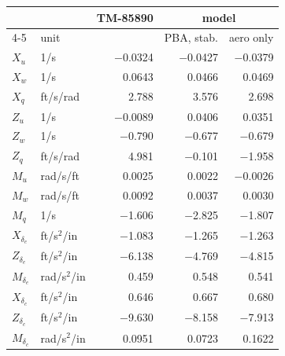 \begin{tabular}{@{}llrrr@{}}
\toprule
 & & TM-85890 & \multicolumn{2}{c}{model} \\
\cmidrule(l){4-5}
 & unit & \cite{hb} & PBA, stab. & aero only \\
\midrule
$X_{u}$ & 1/s & $-$0.0324 & $-$0.0427 & $-$0.0379 \\
$X_{w}$ & 1/s & 0.0643 & 0.0466 & 0.0469 \\
$X_{q}$ & ft/s/rad & 2.788 & 3.576 & 2.698 \\
$Z_{u}$ & 1/s & $-$0.0089 & 0.0406 & 0.0351 \\
$Z_{w}$ & 1/s & $-$0.790 & $-$0.677 & $-$0.679 \\
$Z_{q}$ & ft/s/rad & 4.981 & $-$0.101 & $-$1.958 \\
$M_{u}$ & rad/s/ft & 0.0025 & 0.0022 & $-$0.0026 \\
$M_{w}$ & rad/s/ft & 0.0092 & 0.0037 & 0.0030 \\
$M_{q}$ & 1/s & $-$1.606 & $-$2.825 & $-$1.807 \\
$X_{\delta_e}$ & ft/s$^2$/in & $-$1.083 & $-$1.265 & $-$1.263 \\
$Z_{\delta_e}$ & ft/s$^2$/in & $-$6.138 & $-$4.769 & $-$4.815 \\
$M_{\delta_e}$ & rad/s$^2$/in & 0.459 & 0.548 & 0.541 \\
$X_{\delta_c}$ & ft/s$^2$/in & 0.646 & 0.667 & 0.680 \\
$Z_{\delta_c}$ & ft/s$^2$/in & $-$9.630 & $-$8.158 & $-$7.913 \\
$M_{\delta_c}$ & rad/s$^2$/in & 0.0951 & 0.0723 & 0.1622 \\
\bottomrule
\end{tabular}
